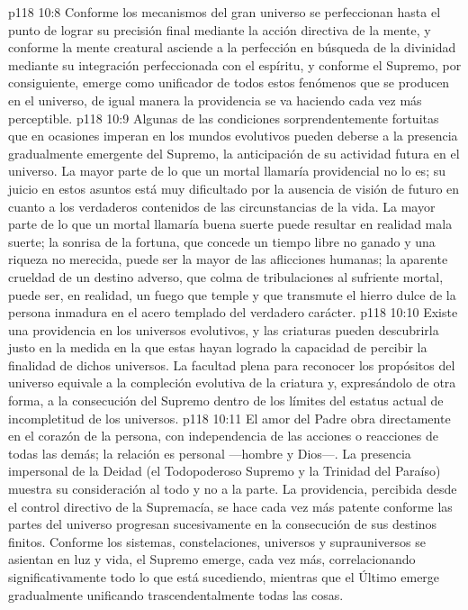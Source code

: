 \vs p118 10:8 Conforme los mecanismos del gran universo se perfeccionan hasta el punto de lograr su precisión final mediante la acción directiva de la mente, y conforme la mente creatural asciende a la perfección en búsqueda de la divinidad mediante su integración perfeccionada con el espíritu, y conforme el Supremo, por consiguiente, emerge como unificador  de todos estos fenómenos que se producen en el universo, de igual manera la providencia se va haciendo cada vez más perceptible.
\vs p118 10:9 Algunas de las condiciones sorprendentemente fortuitas que en ocasiones imperan en los mundos evolutivos pueden deberse a la presencia gradualmente emergente del Supremo, la anticipación de su actividad futura en el universo. La mayor parte de lo que un mortal llamaría providencial no lo es; su juicio en estos asuntos está muy dificultado por la ausencia de visión de futuro en cuanto a los verdaderos contenidos de las circunstancias de la vida. La mayor parte de lo que un mortal llamaría buena suerte puede resultar en realidad mala suerte; la sonrisa de la fortuna, que concede un tiempo libre no ganado y una riqueza no merecida, puede ser la mayor de las aflicciones humanas; la aparente crueldad de un destino adverso, que colma de tribulaciones al sufriente mortal, puede ser, en realidad, un fuego que temple y que transmute el hierro dulce de la persona inmadura en el acero templado del verdadero carácter.
\vs p118 10:10 Existe una providencia en los universos evolutivos, y las criaturas pueden descubrirla justo en la medida en la que estas hayan logrado la capacidad de percibir la finalidad de dichos universos. La facultad plena para reconocer los propósitos del universo equivale a la compleción evolutiva de la criatura y, expresándolo de otra forma, a la consecución del Supremo dentro de los límites del estatus actual de incompletitud de los universos.
\vs p118 10:11 El amor del Padre obra directamente en el corazón de la persona, con independencia de las acciones o reacciones de todas las demás; la relación es personal ---hombre y Dios---. La presencia impersonal de la Deidad (el Todopoderoso Supremo y la Trinidad del Paraíso) muestra su consideración al todo y no a la parte. La providencia, percibida desde el control directivo de la Supremacía, se hace cada vez más patente conforme las partes del universo progresan sucesivamente en la consecución de sus destinos finitos. Conforme los sistemas, constelaciones, universos y suprauniversos se asientan en luz y vida, el Supremo emerge, cada vez más, correlacionando significativamente todo lo que está sucediendo, mientras que el Último emerge gradualmente unificando trascendentalmente todas las cosas.
